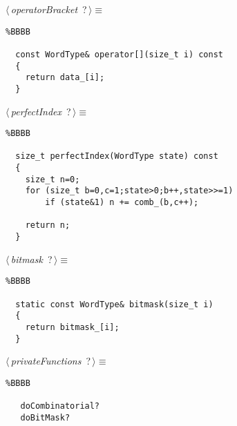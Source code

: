 \documentclass{report}
\begin{document}
\begin{flushleft} \small
\begin{minipage}{\linewidth}\label{scrap9}\raggedright\small
{} $\langle\,${\it operatorBracket}\nobreak\ {\footnotesize {?}}$\,\rangle\equiv$
\begin{lstlisting}%BBBB
    
  const WordType& operator[](size_t i) const  
  {  
  	return data_[i];  
  }  \end{lstlisting}
\end{minipage}\vspace{4ex}
\end{flushleft}
\begin{flushleft} \small
\begin{minipage}{\linewidth}\label{scrap10}\raggedright\small
{} $\langle\,${\it perfectIndex}\nobreak\ {\footnotesize {?}}$\,\rangle\equiv$
\begin{lstlisting}%BBBB
    
  size_t perfectIndex(WordType state) const  
  {  
  	size_t n=0;  
  	for (size_t b=0,c=1;state>0;b++,state>>=1)  
  		if (state&1) n += comb_(b,c++);  
    
  	return n;  
  }  \end{lstlisting}
\end{minipage}\vspace{4ex}
\end{flushleft}
\begin{flushleft} \small
\begin{minipage}{\linewidth}\label{scrap11}\raggedright\small
{} $\langle\,${\it bitmask}\nobreak\ {\footnotesize {?}}$\,\rangle\equiv$
\begin{lstlisting}%BBBB
    
  static const WordType& bitmask(size_t i)  
  {  
  	return bitmask_[i];  
  }  \end{lstlisting}
\end{minipage}\vspace{4ex}
\end{flushleft}
\begin{flushleft} \small
\begin{minipage}{\linewidth}\label{scrap12}\raggedright\small
{} $\langle\,${\it privateFunctions}\nobreak\ {\footnotesize {?}}$\,\rangle\equiv$
\begin{lstlisting}%BBBB
    
   doCombinatorial?  
   doBitMask?  
   \end{lstlisting}
\end{minipage}\vspace{4ex}
\end{flushleft}
\end{document}

